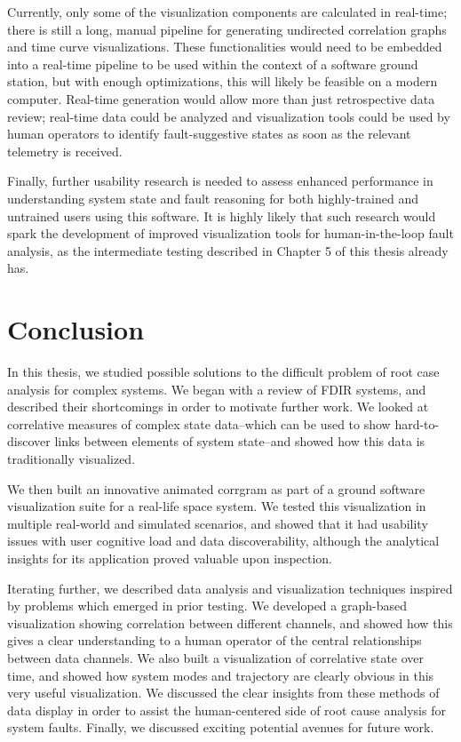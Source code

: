 Currently, only some of the visualization components are calculated in real-time; there is still a long, manual pipeline for generating undirected correlation graphs and time curve visualizations. These functionalities would need to be embedded into a real-time pipeline to be used within the context of a software ground station, but with enough optimizations, this will likely be feasible on a modern computer. Real-time generation would allow more than just retrospective data review; real-time data could be analyzed and visualization tools could be used by human operators to identify fault-suggestive states as soon as the relevant telemetry is received.

Finally, further usability research is needed to assess enhanced performance in understanding system state and fault reasoning for both highly-trained and untrained users using this software. It is highly likely that such research would spark the development of improved visualization tools for human-in-the-loop fault analysis, as the intermediate testing described in Chapter 5 of this thesis already has.

\section{Conclusion}

In this thesis, we studied possible solutions to the difficult problem of root case analysis for complex systems. We began with a review of FDIR systems, and described their shortcomings in order to motivate further work. We looked at correlative measures of complex state data--which can be used to show hard-to-discover links between elements of system state--and showed how this data is traditionally visualized.

We then built an innovative animated corrgram as part of a ground software visualization suite for a real-life space system. We tested this visualization in multiple real-world and simulated scenarios, and showed that it had usability issues with user cognitive load and data discoverability, although the analytical insights for its application proved valuable upon inspection.

Iterating further, we described data analysis and visualization techniques inspired by problems which emerged in prior testing. We developed a graph-based visualization showing correlation between different channels, and showed how this gives a clear understanding to a human operator of the central relationships between data channels. We also built a visualization of correlative state over time, and showed how system modes and trajectory are clearly obvious in this very useful visualization. We discussed the clear insights from these methods of data display in order to assist the human-centered side of root cause analysis for system faults. Finally, we discussed exciting potential avenues for future work.

